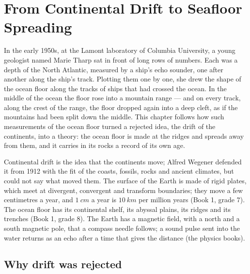 \chapter{From Continental Drift to Seafloor Spreading}\label{ch:g11:drift-to-spreading}

In the early 1950s, at the Lamont laboratory of Columbia University, a young
geologist named Marie Tharp sat in front of long rows of numbers. Each was a depth of the North
Atlantic, measured by a ship's echo sounder, one after another along the ship's
track. Plotting them one by one, she drew the shape of the ocean floor along
the tracks of ships that had crossed the ocean. In the middle of the ocean the floor rose
into a mountain range --- and on every track, along the crest of the range, the
floor dropped again into a deep cleft, as if the mountains had been split down
the middle. This chapter follows how such measurements of the ocean floor turned
a rejected idea, the drift of the continents, into a theory: the ocean floor
is made at the ridges and spreads away from them, and it carries in its rocks a
record of its own age.

\begin{recall}
Continental drift is the idea that the continents move; Alfred Wegener
defended it from 1912 with the fit of the coasts, fossils, rocks and ancient
climates, but could not say what moved them. The surface of the Earth is made
of rigid plates, which meet at divergent, convergent and transform boundaries;
they move a few centimetres a year, and $\qty{1}{cm}$ a year is $\qty{10}{km}$
per million years (Book 1, grade 7). The ocean floor has its continental
shelf, its abyssal plains, its ridges and its trenches (Book 1, grade 8).
The Earth has a magnetic field, with a north and a south magnetic pole, that
a compass needle follows; a sound pulse sent into the water returns as an echo
after a time that gives the distance (the physics books).
\end{recall}

\section{Why drift was rejected}

